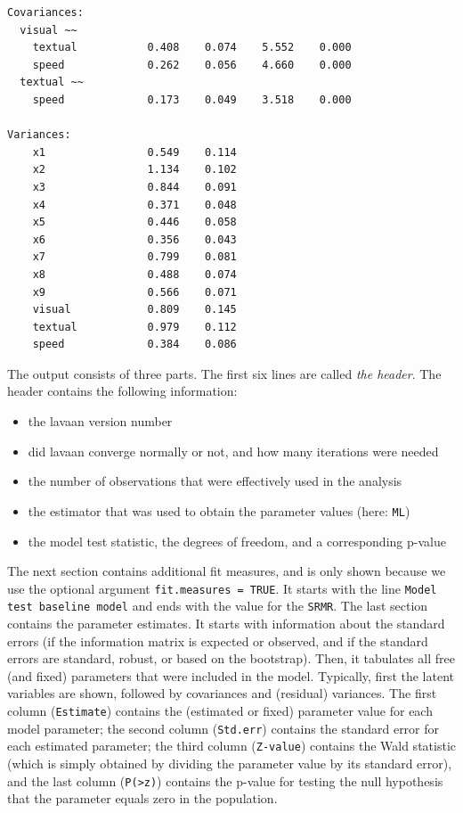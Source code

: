 \begin{verbatim}
Covariances:
  visual ~~
    textual           0.408    0.074    5.552    0.000
    speed             0.262    0.056    4.660    0.000
  textual ~~
    speed             0.173    0.049    3.518    0.000

Variances:
    x1                0.549    0.114
    x2                1.134    0.102
    x3                0.844    0.091
    x4                0.371    0.048
    x5                0.446    0.058
    x6                0.356    0.043
    x7                0.799    0.081
    x8                0.488    0.074
    x9                0.566    0.071
    visual            0.809    0.145
    textual           0.979    0.112
    speed             0.384    0.086
\end{verbatim}

The output consists of three parts. The first six lines are called
\emph{the header}. The header contains the following information:

\begin{itemize}
\itemsep1pt\parskip0pt
\item
  the lavaan version number
\item
  did lavaan converge normally or not, and how many iterations were
  needed
\item
  the number of observations that were effectively used in the analysis
\item
  the estimator that was used to obtain the parameter values (here:
  \texttt{ML})
\item
  the model test statistic, the degrees of freedom, and a corresponding
  p-value
\end{itemize}

The next section contains additional fit measures, and is only shown
because we use the optional argument \texttt{fit.measures = TRUE}. It
starts with the line \texttt{Model test baseline model} and ends with
the value for the \texttt{SRMR}. The last section contains the parameter
estimates. It starts with information about the standard errors (if the
information matrix is expected or observed, and if the standard errors
are standard, robust, or based on the bootstrap). Then, it tabulates all
free (and fixed) parameters that were included in the model. Typically,
first the latent variables are shown, followed by covariances and
(residual) variances. The first column (\texttt{Estimate}) contains the
(estimated or fixed) parameter value for each model parameter; the
second column (\texttt{Std.err}) contains the standard error for each
estimated parameter; the third column (\texttt{Z-value}) contains the
Wald statistic (which is simply obtained by dividing the parameter value
by its standard error), and the last column
(\texttt{P(\textgreater{}\textbar{}z\textbar{})}) contains the p-value
for testing the null hypothesis that the parameter equals zero in the
population.

